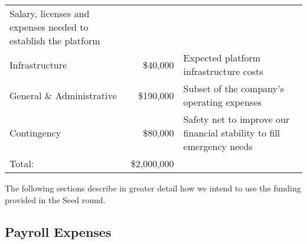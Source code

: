 \documentclass[10pt,openany]{book}
\begin{document}
\begin{longtable}[]{@{}lrl@{}}
\begin{minipage}[t]{0.50\columnwidth}
Salary, licenses and expenses needed to establish the platform\strut
\end{minipage}\tabularnewline
\begin{minipage}[t]{0.27\columnwidth}\raggedright
Infrastructure\strut
\end{minipage} & \begin{minipage}[t]{0.14\columnwidth}\raggedleft
\$40,000\strut
\end{minipage} & \begin{minipage}[t]{0.50\columnwidth}\raggedright
Expected platform infrastructure costs\strut
\end{minipage}\tabularnewline
\begin{minipage}[t]{0.27\columnwidth}\raggedright
General \& Administrative\strut
\end{minipage} & \begin{minipage}[t]{0.14\columnwidth}\raggedleft
\$190,000\strut
\end{minipage} & \begin{minipage}[t]{0.50\columnwidth}\raggedright
Subset of the company's operating expenses\strut
\end{minipage}\tabularnewline
\begin{minipage}[t]{0.27\columnwidth}\raggedright
Contingency\strut
\end{minipage} & \begin{minipage}[t]{0.14\columnwidth}\raggedleft
\$80,000\strut
\end{minipage} & \begin{minipage}[t]{0.50\columnwidth}\raggedright
Safety net to improve our financial stability to fill emergency
needs\strut
\end{minipage}\tabularnewline
\begin{minipage}[t]{0.27\columnwidth}\raggedright
Total:\strut
\end{minipage} & \begin{minipage}[t]{0.14\columnwidth}\raggedleft
\$2,000,000\strut
\end{minipage} & \begin{minipage}[t]{0.50\columnwidth}\raggedright
\strut
\end{minipage}\tabularnewline
\bottomrule
\end{longtable}

The following sections describe in greater detail how we intend to use
the funding provided in the Seed round.

\hypertarget{payroll-expenses}{%
\subsection{Payroll Expenses}\label{payroll-expenses}}
\end{document}
